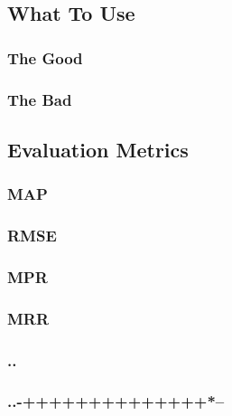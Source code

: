 
\subsection{What To Use}


\subsubsection{The Good}


\subsubsection{The Bad}



\subsection{Evaluation Metrics}
\subsubsection{MAP}
\subsubsection{RMSE}
\subsubsection{MPR}
\subsubsection{MRR}
\subsubsection{..}
\subsubsection{..-++++++++++++++*--}
